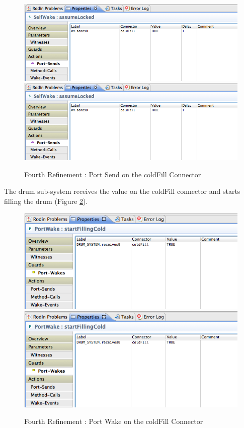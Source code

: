  \begin{figure}[!htbp]
  \centering
  \ifplastex
  \includegraphics[width=1024]{figures/image44.png}
  \else
  \includegraphics[width=1\textwidth]{figures/image44.png}
  \fi
  \caption{Fourth Refinement : Port Send on the coldFill Connector}
  \label{fig:FourthRefinementPortSendOnTheColdFillConnector}
\end{figure} 
 
The drum sub-system receives the value on the coldFill connector and starts filling the drum (Figure \ref{fig:FourthRefinementPortWakeOnTheColdFillConnector}).
 
 \begin{figure}[!htbp]
  \centering
  \ifplastex
  \includegraphics[width=1024]{figures/image45.png}
  \else
  \includegraphics[width=1\textwidth]{figures/image45.png}
  \fi
  \caption{Fourth Refinement : Port Wake on the coldFill Connector}
  \label{fig:FourthRefinementPortWakeOnTheColdFillConnector}
\end{figure}  
 
